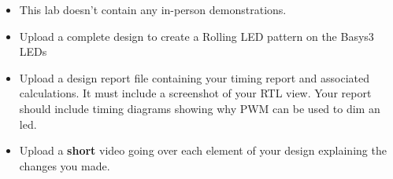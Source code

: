 \begin{itemize}
    \item This lab doesn't contain any in-person demonstrations.
    \item Upload a complete design to create a Rolling LED pattern on the Basys3 LEDs
    \item Upload a design report file containing your timing report and associated calculations. It must include a screenshot of your RTL view. Your report should include timing diagrams showing why PWM can be used to dim an led.
    \item Upload a \textbf{short} video going over each element of your design explaining the changes you made.
\end{itemize}